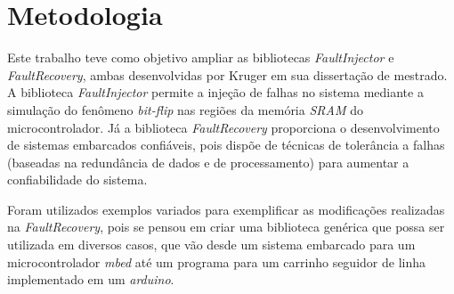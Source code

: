 
\chapter{Metodologia} \label{cap:metodologia}


Este trabalho teve como objetivo ampliar as bibliotecas \textit{FaultInjector} e \textit{FaultRecovery}, ambas desenvolvidas por Kruger \cite{Kruger:2014} em sua dissertação de mestrado. A biblioteca \textit{FaultInjector} permite a injeção de falhas no sistema mediante a simulação do fenômeno \textit{bit-flip} nas regiões da memória \textit{SRAM} do microcontrolador. Já a biblioteca \textit{FaultRecovery} proporciona o desenvolvimento de sistemas embarcados confiáveis, pois dispõe de técnicas de tolerância a falhas (baseadas na redundância de dados e de processamento) para aumentar a confiabilidade do sistema.

Foram utilizados exemplos variados para exemplificar as modificações realizadas na \textit{FaultRecovery}, pois se pensou em criar uma biblioteca genérica que possa ser utilizada em diversos casos, que vão desde um sistema embarcado para um microcontrolador \textit{mbed} até um programa para um carrinho seguidor de linha implementado em um \textit{arduino}.

